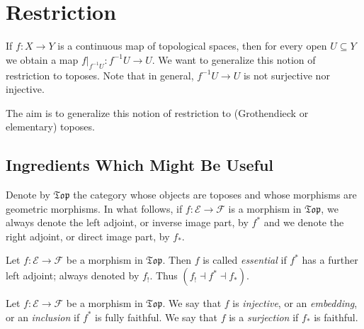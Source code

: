 %
%

\chapter{Restriction}

If $f : X \to Y$ is a continuous map of topological spaces, then for every open $U \subseteq Y$ we obtain a map $f|_{f^{-1}U}:f^{-1}U \to U$. We want to generalize this notion of restriction to toposes. Note that in general, $f^{-1}U \to U$ is not surjective nor injective.

The aim is to generalize this notion of restriction to (Grothendieck or elementary) toposes.

\section{Ingredients Which Might Be Useful}

Denote by $\mathfrak{Top}$ the category whose objects are toposes and whose morphisms are geometric morphisms. In what follows, if $f : \mathscr{E} \to \mathscr{F}$ is a morphism in $\mathfrak{Top}$, we always denote the left adjoint, or inverse image part, by $f^*$ and we denote the right adjoint, or direct image part, by $f_*$.

\begin{definition} Let $f : \mathscr{E} \to \mathscr{F}$ be a morphism in $\mathfrak{Top}$. Then $f$ is called \emph{essential} if $f^*$ has a further left adjoint; always denoted by $f_!$. Thus $(f_! \dashv f^* \dashv f_*)$.
\end{definition}

\begin{definition}
Let $f : \mathscr{E} \to \mathscr{F}$ be a morphism in $\mathfrak{Top}$. We say that $f$ is \emph{injective}, or an \emph{embedding}, or an \emph{inclusion} if $f^*$ is fully faithful. 
We say that $f$ is a \emph{surjection} if $f_*$ is faithful.
\end{definition}

